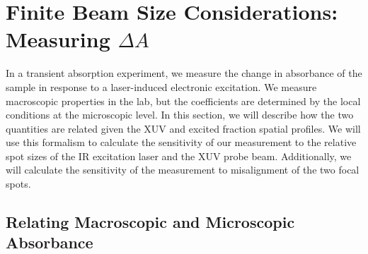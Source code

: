 \section{Finite Beam Size Considerations: Measuring $\Delta A$}
In a transient absorption experiment, we measure the change in absorbance of the sample in response to a laser-induced electronic excitation. We measure macroscopic properties in the lab, but the coefficients are determined by the local conditions at the microscopic level. In this section, we will describe how the two quantities are related given the XUV and excited fraction spatial profiles. We will use this formalism to calculate the sensitivity of our measurement to the relative spot sizes of the IR excitation laser and the XUV probe beam. Additionally, we will calculate the sensitivity of the measurement to misalignment of the two focal spots.

\subsection{Relating Macroscopic and Microscopic Absorbance}
\label{sec:micro_macro_DeltaA}

